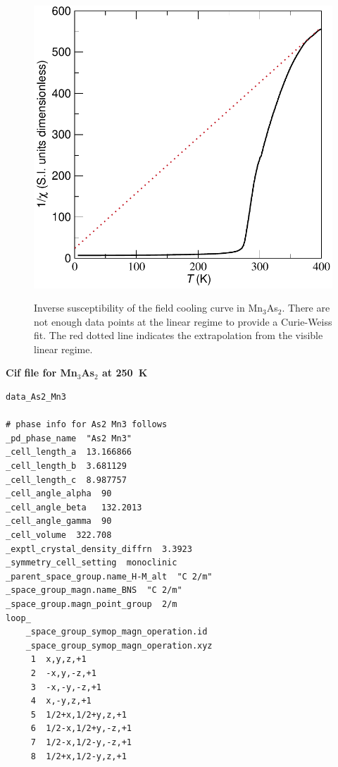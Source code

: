 \documentclass[letterpaper,10pt,doublespacing,edeposit]{uiucthesis2020}
\begin{document}
\begin{mainmatter}
\begin{figure}
\centering\includegraphics[width=0.6\columnwidth]{figures/ch6/FC_52A_inverse_cropped.pdf} \\
\caption{\label{fig:inverse_susceptibility}
Inverse susceptibility of the field cooling curve in Mn$_3$As$_2$. There are not enough data points at the linear regime to provide a Curie-Weiss fit. The red dotted line indicates the extrapolation from the visible linear regime.
} 
\end{figure}





\FloatBarrier

\vspace{1em}
\begin{center}
\textbf{Cif file for Mn$_3$As$_2$ at 250~K}\\
\end{center}
\normalsize

\begin{verbatim}
data_As2_Mn3

# phase info for As2 Mn3 follows
_pd_phase_name  "As2 Mn3"
_cell_length_a  13.166866
_cell_length_b  3.681129
_cell_length_c  8.987757
_cell_angle_alpha  90
_cell_angle_beta   132.2013
_cell_angle_gamma  90
_cell_volume  322.708
_exptl_crystal_density_diffrn  3.3923
_symmetry_cell_setting  monoclinic
_parent_space_group.name_H-M_alt  "C 2/m"
_space_group_magn.name_BNS  "C 2/m"
_space_group.magn_point_group  2/m
loop_
    _space_group_symop_magn_operation.id
    _space_group_symop_magn_operation.xyz
     1  x,y,z,+1
     2  -x,y,-z,+1
     3  -x,-y,-z,+1
     4  x,-y,z,+1
     5  1/2+x,1/2+y,z,+1
     6  1/2-x,1/2+y,-z,+1
     7  1/2-x,1/2-y,-z,+1
     8  1/2+x,1/2-y,z,+1


\end{verbatim}
\end{mainmatter}
\end{document}
